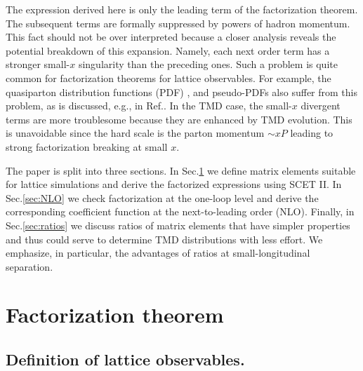 \documentclass[a4paper, amsfonts, amssymb, amsmath, reprint, showkeys, nofootinbib, twoside]{revtex4-1}
\renewcommand{\(}{\left(}
\renewcommand{\)}{\right)}
\renewcommand{\[}{\left[}
\renewcommand{\]}{\right]}
\begin{document}
The expression derived here is only the leading term of the factorization theorem. The subsequent terms are formally suppressed by powers of hadron momentum. This fact should not be over interpreted because a closer analysis reveals the potential breakdown of this expansion. Namely, each next order term has a stronger small-$x$ singularity than the preceding ones. Such a problem is quite common for factorization theorems for lattice observables. For example, the quasiparton distribution functions (PDF) \cite{Ji:2013dva}, and pseudo-PDFs \cite{Radyushkin:2017cyf} also suffer from this problem, as is discussed, e.g., in Ref.\cite{Braun:2018brg}.  In the TMD case, the small-$x$ divergent terms are more troublesome because they are enhanced by TMD evolution. This is unavoidable since the hard scale is the parton momentum $\sim x P$ leading to strong factorization breaking at small $x$.

The paper is split into three sections. In Sec.\ref{sec:factorization} we define matrix elements suitable for lattice simulations and derive the factorized expressions using SCET II. In Sec.\ref{sec:NLO} we check factorization at the one-loop level and derive the corresponding coefficient function at the next-to-leading order (NLO). Finally, in Sec.\ref{sec:ratios} we discuss ratios of matrix elements that have simpler properties and thus could serve to determine TMD distributions with less effort. We emphasize, in particular, the advantages of ratios at small-longitudinal separation.


\section{Factorization theorem}
\label{sec:factorization}

\subsection{Definition of lattice observables.} 
\end{document}
